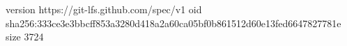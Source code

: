 version https://git-lfs.github.com/spec/v1
oid sha256:333ce3e3bbcff853a3280d418a2a60ca05bf0b861512d60e13fed6647827781e
size 3724
